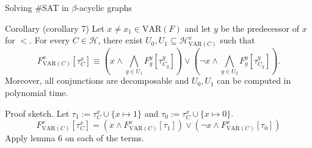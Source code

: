\begin{frame}[t]{Solving \#SAT in $\beta$-acyclic graphs}
	\begin{block}{Corollary (corollary 7)}
		Let $x \neq x_1 \in \mathrm{VAR}(F)$ and let $y$ be the predecessor of $x$ for $<$. For every $C \in \mathcal{H}$, there exist $U_0, U_1 \subseteq \mathcal{H}^x_{\mathrm{VAR}(C)}$ such that
		$$F^x_{\mathrm{VAR}(C)}[\tau^x_C] \equiv 
		( x \land \bigwedge\limits_{g \in U_1} F^y_g[\tau^y_{C_g}]) \lor
		( \lnot x \land \bigwedge\limits_{g \in U_2} F^y_g[\tau^y_{C_g}]).
		$$
		Moreover, all conjunctions are decomposable and $U_0, U_1$ can be computed in polynomial time.
	\end{block}

	\pause
	Proof sketch. Let $\tau_1 := \tau^x_C \cup \{x \mapsto 1\}$ and $\tau_0 := \tau^x_C \cup \{x \mapsto 0\}$.
	$$F^x_{\mathrm{VAR}(C)}[\tau^x_C] =  (x \land F^x_{\mathrm{VAR}(C)}[\tau_1]) \lor (\lnot x \land F^x_{\mathrm{VAR}(C)}[\tau_0])$$	
		Apply lemma 6 on each of the terms.
\end{frame}

